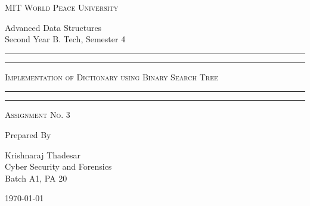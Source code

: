\documentclass[11pt]{article}
\begin{document}
\begin{titlepage}
	\centering


	\huge\textsc{
		MIT World Peace University
	}\\

	\vspace{0.75\baselineskip} %

	\LARGE{
		Advanced Data Structures\\
		Second Year B. Tech, Semester 4
	}

	\vfill %


	\rule{\textwidth}{1.6pt}\vspace*{-\baselineskip}\vspace*{2pt}
	\rule{\textwidth}{0.6pt}
	\vspace{0.75\baselineskip} %



	\huge{\textsc{
			Implementation of Dictionary using Binary Search Tree
		}} \\



	\vspace{0.5\baselineskip} %
	\rule{\textwidth}{0.6pt}\vspace*{-\baselineskip}\vspace*{2.8pt}
	\rule{\textwidth}{1.6pt}

	\vspace{1\baselineskip} %


	\LARGE\textsc{
		Assignment No. 3
	} %
	\vfill


	Prepared By
	\vspace{0.5\baselineskip} %

	\Large{
		Krishnaraj Thadesar \\
		Cyber Security and Forensics\\
		Batch A1, PA 20
	}


	\vspace{0.5\baselineskip} %
	\today

\end{titlepage}
\end{document}
